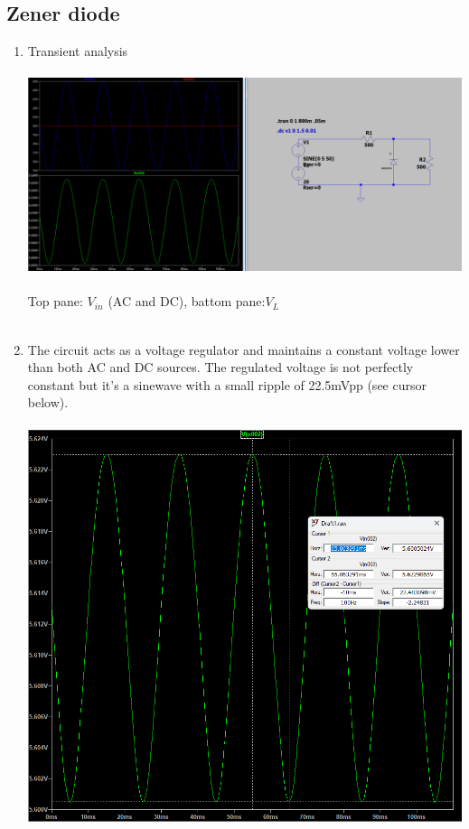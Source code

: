 \documentclass{article}
\begin{document}
		\subsection{Zener diode}
			\begin{enumerate}
				\item Transient analysis\\\\
				\includegraphics[scale=0.35]{prelab/problem 5 - 1}\\\\
				Top pane: \(V_{in}\) (AC and DC), battom pane:\(V_L\)\\\\
				\item The circuit acts as a voltage regulator and maintains a constant voltage lower than both AC and DC sources. The regulated voltage is not perfectly constant but it's a sinewave with a small ripple of 22.5mVpp (see cursor below).\\\\
				\includegraphics[scale=0.45]{prelab/problem 5 - 2}\\\\
			\end{enumerate}
		\pagebreak
		
\end{document}
